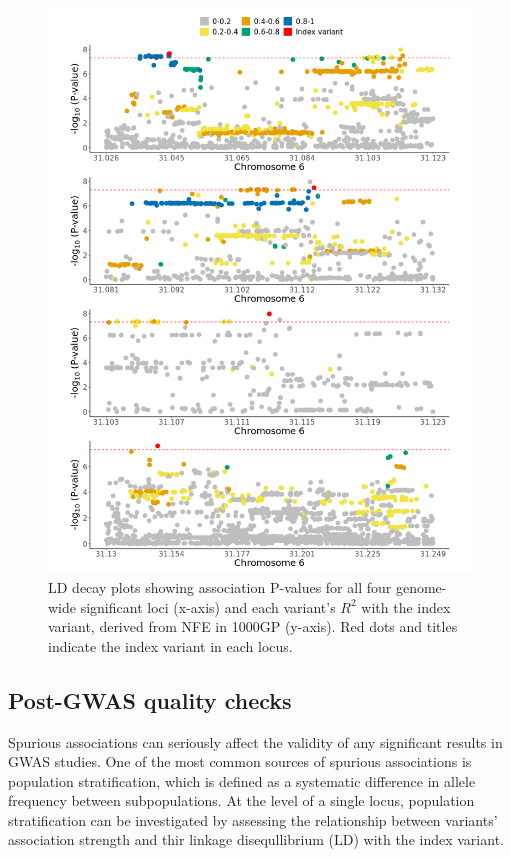       \begin{figure}[H] 
        \centering    
        \includegraphics[width=1.0\textwidth]{Vector/ukbb_mhc_regional_assoc_plots.png}
        \caption[Figure]{LD decay plots showing association P-values for all four genome-wide significant loci (x-axis) and each variant's $R^{2}$ with the index variant, derived from NFE in 1000GP (y-axis). Red dots and titles indicate the index variant in each locus.}
        \label{fig:ukbb_mhc_regional_assoc_plots}
        \end{figure}

    \subsection{Post-GWAS quality checks}
    Spurious associations can seriously affect the validity of any significant results in GWAS studies. One of the most common sources of spurious associations is population stratification, which is defined as a systematic difference in allele frequency between subpopulations. At the level of a single locus,  population stratification can be investigated by assessing the relationship between variants' association strength and thir linkage disequllibrium (LD) with the index variant.
    
